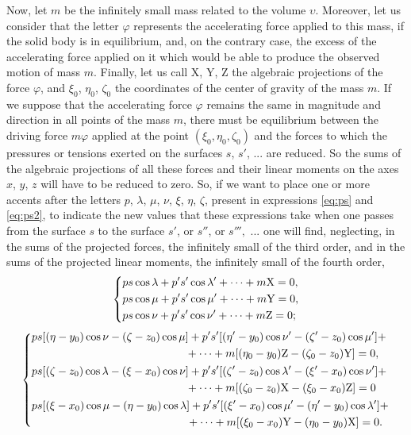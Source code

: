 \documentclass[leqno,openright,smallroyalvopaper,8pt,twoside,showtrims]{memoir}
\begin{document}
Now, let $m$ be the infinitely small mass related to the volume $\upsilon$. Moreover, let us consider that the letter $\varphi$ represents the accelerating force applied to this mass, if the solid body is in equilibrium, and, on the contrary case, the excess of the accelerating force applied on it which would be able to produce the observed motion of mass $m$. Finally, let us call X, Y, Z the algebraic projections of the force $\varphi$, and $\xi_0$, $\eta_0$, $\zeta_0$ the coordinates of the center of gravity of the mass $m$. If we suppose that the accelerating force $\varphi$ remains the same in magnitude and direction in all points of the mass $m$, there must be equilibrium between the driving force $m\varphi$ applied at the point $(\xi_0,\eta_0,\zeta_0)$ and the forces to which the pressures or tensions exerted on the surfaces $s$, $s'$, ... are reduced. So the sums of the algebraic projections of all these forces and their linear moments on the axes $x$, $y$, $z$ will have to be reduced to zero. So, if we want to place one or more accents after the letters $p$, $\lambda$, $\mu$, $\nu$, $\xi$, $\eta$, $\zeta$, present in expressions \eqref{eq:ps} and \eqref{eq:ps2}, to indicate the new values that these expressions take when one passes from the surface $s$ to the surface $s'$, or $s''$, or $s''',$ ... one will find, neglecting, in the sums of the projected forces, the infinitely small of the third order, and in the sums of the projected linear moments, the infinitely small of the fourth order,
 \begin{equation}
   \begin{dcases}
        ps\cos\lambda+p's'\cos\lambda'+\cdots+m\text{X}=0,\\
       ps\cos\mu+p's'\cos\mu'+\cdots+m\text{Y}=0,\\
        ps\cos\nu+p's'\cos\nu'+\cdots+m\text{Z}=0;
   \end{dcases}
 \end{equation}
 \begin{equation}\label{eq:momentos}
   \begin{dcases}
   \begin{aligned}
        ps[(\eta-y_0)\cos\nu-(\zeta-z_0)\cos\mu&]+p's'[(\eta'-y_0)\cos\nu'-(\zeta'-z_0)\cos\mu']+\\
        &+\cdots+m[(\eta_0-y_0)\text{Z}-(\zeta_0-z_0)\text{Y}]=0,
   \end{aligned}\\
         \begin{aligned}
        ps[(\zeta-z_0)\cos\lambda-(\xi-x_0)\cos\nu&]+p's'[(\zeta'-z_0)\cos\lambda'-(\xi'-x_0)\cos\nu']+\\
        &+\cdots+m[(\zeta_0-z_0)\text{X}-(\xi_0-x_0)\text{Z}]=0
   \end{aligned}\\
         \begin{aligned}
        ps[(\xi-x_0)\cos\mu-(\eta-y_0)\cos\lambda&]+p's'[(\xi'-x_0)\cos\mu'-(\eta'-y_0)\cos\lambda']+\\
        &+\cdots+m[(\xi_0-x_0)\text{Y}-(\eta_0-y_0)\text{X}]=0.
   \end{aligned}
   \end{dcases}
 \end{equation}
\end{document}

